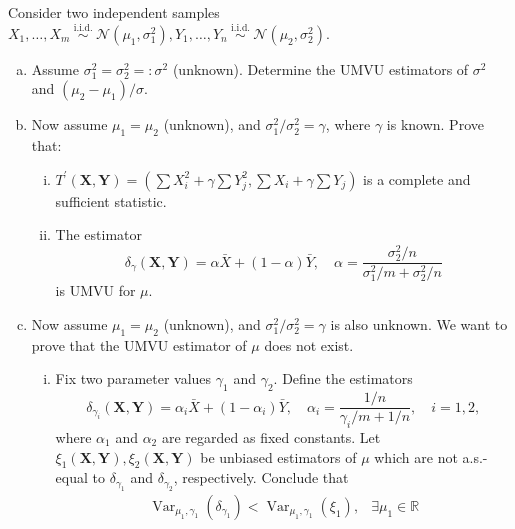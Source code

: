 \begin{exercise}
    Consider two independent samples \(X_{1}, \ldots, X_{m} \stackrel{\text { i.i.d. }}{\sim} \mathcal{N}\left(\mu_{1}, \sigma_{1}^{2}\right), Y_{1}, \ldots, Y_{n} \stackrel{\text { i.i.d. }}{\sim} \mathcal{N}\left(\mu_{2}, \sigma_{2}^{2}\right)\). 
    \begin{enumerate}[(a)]
        \item Assume \(\sigma_{1}^{2}=\sigma_{2}^{2}=: \sigma^{2}\) (unknown). Determine the UMVU estimators of \(\sigma^{2}\) and \(\left(\mu_{2}-\mu_{1}\right) / \sigma\). 
        \item Now assume \(\mu_{1}=\mu_{2}\) (unknown), and \(\sigma_{1}^{2} / \sigma_{2}^{2}=\gamma\), where \(\gamma\) is known. Prove that: 
        \begin{enumerate}[(i)]
            \item \(T^{\prime}(\mathbf{X}, \mathbf{Y})=\left(\sum X_{i}^{2}+\gamma \sum Y_{j}^{2}, \sum X_{i}+\gamma \sum Y_{j}\right)\) is a complete and sufficient statistic. 
            \item The estimator
            \[
                \delta_{\gamma}(\mathbf{X}, \mathbf{Y})=\alpha \bar{X}+(1-\alpha) \bar{Y}, \quad \alpha=\frac{\sigma_{2}^{2} / n}{\sigma_{1}^{2} / m+\sigma_{2}^{2} / n}
            \]
            is UMVU for \(\mu\). 
        \end{enumerate}
        \item Now assume \(\mu_{1}=\mu_{2}\) (unknown), and \(\sigma_{1}^{2} / \sigma_{2}^{2}=\gamma\) is also unknown. We want to prove that the UMVU estimator of \(\mu\) does not exist. 
        \begin{enumerate}[(i)]
            \item Fix two parameter values \(\gamma_{1}\) and \(\gamma_{2}\). Define the estimators
            \[
            \delta_{\gamma_{i}}(\mathbf{X}, \mathbf{Y})=\alpha_{i} \bar{X}+\left(1-\alpha_{i}\right) \bar{Y}, \quad \alpha_{i}=\frac{1 / n}{\gamma_{i} / m+1 / n}, \quad i=1,2,
            \]
            where \(\alpha_{1}\) and \(\alpha_{2}\) are regarded as fixed constants. Let \(\xi_{1}(\mathbf{X}, \mathbf{Y}), \xi_{2}(\mathbf{X}, \mathbf{Y})\) be unbiased estimators of \(\mu\) which are not a.s.-equal to \(\delta_{\gamma_{1}}\) and \(\delta_{\gamma_{2}}\), respectively. Conclude that
            \[
            \begin{array}{ll}
            \operatorname{Var}_{\mu_{1}, \gamma_{1}}\left(\delta_{\gamma_{1}}\right)<\operatorname{Var}_{\mu_{1}, \gamma_{1}}\left(\xi_{1}\right), & \exists \mu_{1} \in \mathbb{R} \\

\end{array}\]
\end{enumerate}
\end{enumerate}
\end{exercise}
